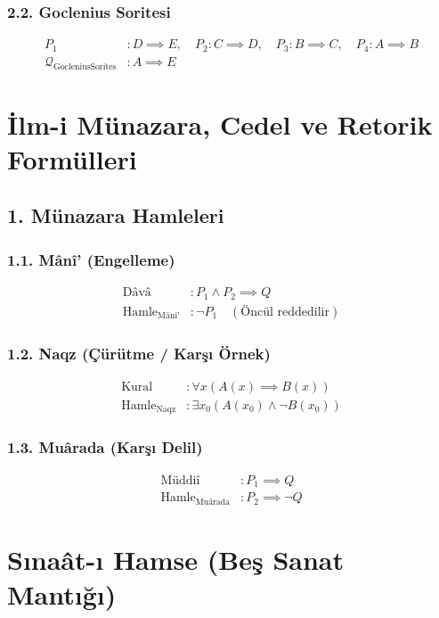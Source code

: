 \documentclass[11pt, a4paper]{article}
\begin{document}
\subsubsection{2.2. Goclenius Soritesi}
\begin{align}
P_1 &: D \implies E, \quad P_2 : C \implies D, \quad P_3 : B \implies C, \quad P_4 : A \implies B \\
\mathcal{Q}_{\text{GocleniusSorites}} &: A \implies E
\end{align}

\section{İlm-i Münazara, Cedel ve Retorik Formülleri}

\subsection{1. Münazara Hamleleri}

\subsubsection{1.1. Mânî' (Engelleme)}
\begin{align}
\text{Dâvâ} &: P_1 \land P_2 \implies Q \\
\text{Hamle}_{\text{Mâni'}} &: \neg P_1 \quad (\text{Öncül reddedilir})
\end{align}

\subsubsection{1.2. Naqz (Çürütme / Karşı Örnek)}
\begin{align}
\text{Kural} &: \forall x (A(x) \implies B(x)) \\
\text{Hamle}_{\text{Naqz}} &: \exists x_0 (A(x_0) \land \neg B(x_0))
\end{align}

\subsubsection{1.3. Muârada (Karşı Delil)}
\begin{align}
\text{Müddiî} &: P_1 \implies Q \\
\text{Hamle}_{\text{Muârada}} &: P_2 \implies \neg Q
\end{align}

\section{Sınaât-ı Hamse (Beş Sanat Mantığı)}
\end{document}
